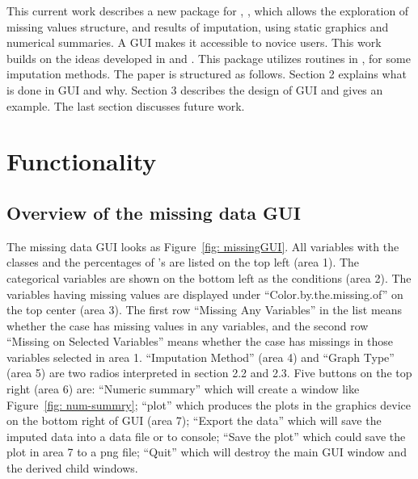 \documentclass[article]{jss}
\begin{document}
This current work describes a new package for , , which allows the exploration of missing values structure, and results of imputation, using static graphics and numerical summaries. A GUI makes it accessible to novice users. This work builds on the ideas developed in \citet{unwin1996interactive} and \citet{swayne1998missing}. This package utilizes routines in  \citep{hmisc},  \citep{norm} for some imputation methods. The paper is structured as follows. Section 2 explains what is done in GUI and why. Section 3 describes the design of GUI and gives an example. The last section discusses future work.

\section{Functionality}

\subsection{Overview of the missing data GUI}

The missing data GUI looks as Figure~\ref{fig: missingGUI}. All variables with the classes and the percentages of 's are listed on the top left (area 1). The categorical variables are shown on the bottom left as the conditions (area 2). The variables having missing values are displayed under ``Color.by.the.missing.of'' on the top center (area 3). The first row ``Missing Any Variables'' in the list means whether the case has missing values in any variables, and the second row ``Missing on Selected Variables'' means whether the case has missings in those variables selected in area 1. ``Imputation Method'' (area 4) and ``Graph Type'' (area 5) are two radios interpreted in section 2.2 and 2.3. Five buttons on the top right (area 6) are: ``Numeric summary'' which will create a window like Figure~\ref{fig: num-summry}; ``plot'' which produces the plots in the graphics device on the bottom right of GUI (area 7); ``Export the data'' which will save the imputed data into a data file or to  console; ``Save the plot'' which could save the plot in area 7 to a png file; ``Quit'' which will destroy the main GUI window and the derived child windows.
\end{document}
